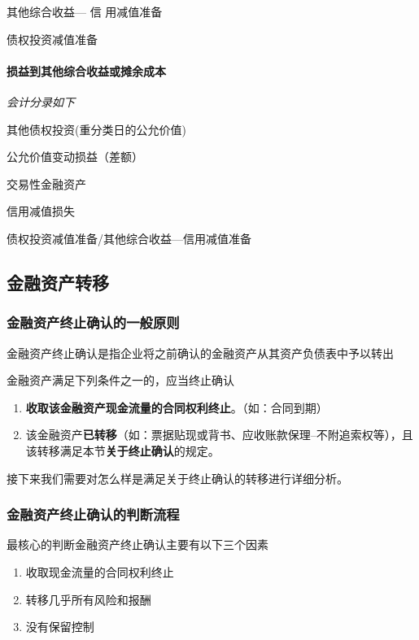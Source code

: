 \documentclass[UTF8,12pt]{ctexart}
\newenvironment{Dr}{%
	\begin{list}{}%
		{
			\setlength{\leftmargin}{2em}
			\setlength{\labelwidth}{2em}
			\setlength{\labelsep}{0pt}
			\setlength{\itemindent}{0pt}
			\setlength{\listparindent}{0pt}
			\setlength{\parsep}{0pt}
			\setlength{\topsep}{0pt}
		}
		\item[\textbf{借：}]
	}{%
	\end{list}
}
\newenvironment{Cr}{%
	\begin{list}{}%
		{
			\setlength{\leftmargin}{3em}
			\setlength{\labelwidth}{2em}
			\setlength{\labelsep}{0pt}
			\setlength{\itemindent}{0pt}
			\setlength{\listparindent}{0pt}
			\setlength{\parsep}{0pt}
			\setlength{\topsep}{0pt}
		}
		\item[\textbf{贷：}]
	}{%
	\end{list}
}
\numberwithin{equation}{section} %
\numberwithin{figure}{section}
\numberwithin{table}{section}
\begin{document}
	\begin{Dr}
		其他综合收益— 信 用减值准备
	\end{Dr}
	\begin{Cr}
		债权投资减值准备
	\end{Cr}
	
	
	\paragraph{损益到其他综合收益或摊余成本}\textit{会计分录如下}
	
	\begin{Dr}
		其他债权投资(重分类日的公允价值)
		
		公允价值变动损益（差额）
	\end{Dr}
	\begin{Cr}
		交易性金融资产
	\end{Cr}
	
	\begin{Dr}
		信用减值损失  
	\end{Dr}
	\begin{Cr}
		债权投资减值准备/其他综合收益—信用减值准备
	\end{Cr}
	
	
	\subsection{金融资产转移}
	\subsubsection{金融资产终止确认的一般原则}
	金融资产终止确认是指企业将之前确认的金融资产从其资产负债表中予以转出
	
	金融资产满足下列条件之一的，应当终止确认
	\begin{enumerate}
		\item \textbf{收取该金融资产现金流量的合同权利终止}。（如：合同到期）
		
		\item 该金融资产\textbf{已转移}（如：票据贴现或背书、应收账款保理--不附追索权等），且该转移满足本节\textbf{关于终止确认}的规定。
	\end{enumerate}
	
	接下来我们需要对怎么样是满足关于终止确认的转移进行详细分析。
	
	\subsubsection{金融资产终止确认的判断流程}
	最核心的判断金融资产终止确认主要有以下三个因素
	\begin{enumerate}
		\item 收取现金流量的合同权利终止
		
		\item 转移几乎所有风险和报酬
		
		\item 没有保留控制
	\end{enumerate}
	
\end{document}
